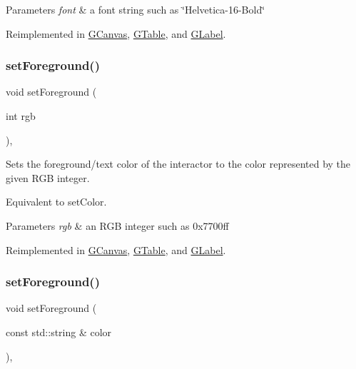 \begin{DoxyParams}{Parameters}
{\em font} & a font string such as \char`\"{}\+Helvetica-\/16-\/\+Bold\char`\"{} \\
\hline
\end{DoxyParams}


Reimplemented in \mbox{\hyperlink{classGCanvas_ab39ef411fb13a52852ddd138c5932e2e}{G\+Canvas}}, \mbox{\hyperlink{classGTable_ab39ef411fb13a52852ddd138c5932e2e}{G\+Table}}, and \mbox{\hyperlink{classGLabel_ab39ef411fb13a52852ddd138c5932e2e}{G\+Label}}.

\mbox{\label{classGInteractor_a9eb856b5ff83a19df3831a31f15f4563}} 
\subsubsection{\texorpdfstring{set\+Foreground()}{setForeground()}\hspace{0.1cm}{\footnotesize\ttfamily [1/2]}}
{\footnotesize\ttfamily void set\+Foreground (\begin{DoxyParamCaption}\item[{int}]{rgb }\end{DoxyParamCaption})\hspace{0.3cm}{\ttfamily [virtual]}, {\ttfamily [inherited]}}



Sets the foreground/text color of the interactor to the color represented by the given R\+GB integer. 

Equivalent to set\+Color. 
\begin{DoxyParams}{Parameters}
{\em rgb} & an R\+GB integer such as 0x7700ff \\
\hline
\end{DoxyParams}


Reimplemented in \mbox{\hyperlink{classGCanvas_af9227e80cbfac55ce936fa5c99ffc954}{G\+Canvas}}, \mbox{\hyperlink{classGTable_af9227e80cbfac55ce936fa5c99ffc954}{G\+Table}}, and \mbox{\hyperlink{classGLabel_af9227e80cbfac55ce936fa5c99ffc954}{G\+Label}}.

\mbox{\label{classGInteractor_af59209aeadea6dfc6d97a2d8531f50e1}} 
\subsubsection{\texorpdfstring{set\+Foreground()}{setForeground()}\hspace{0.1cm}{\footnotesize\ttfamily [2/2]}}
{\footnotesize\ttfamily void set\+Foreground (\begin{DoxyParamCaption}\item[{const std\+::string \&}]{color }\end{DoxyParamCaption})\hspace{0.3cm}{\ttfamily [virtual]}, {\ttfamily [inherited]}}



